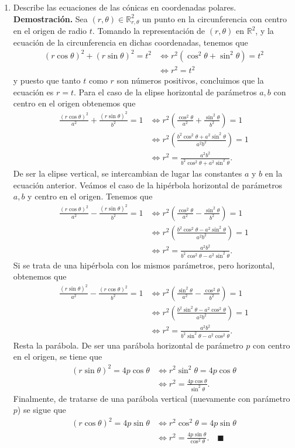 \documentclass[12pt]{article}
\newcommand{\R}{\mathbb R}
\begin{document}
\begin{enumerate}
\newpage
\item Describe las ecuaciones de las c\'onicas en coordenadas polares. \\
\textbf{Demostración.} Sea $(r,\theta)\in \R^2_{r,\theta}$ un punto en la circunferencia con centro en el origen de radio $t$. Tomando la representación de $(r,\theta)$ en
$\R^2$, y la ecuación de la circunferencia en dichas coordenadas, tenemos que
\begin{align*}
    (r\cos\theta)^2+(r\sin\theta)^2=t^2 &\iff r^2(\cos^2\theta+\sin^2\theta)=t^2 \\
    &\iff r^2=t^2
\end{align*}
y puesto que tanto $t$ como $r$ son números positivos, concluimos que la ecuación es $r=t$. Para el caso de la elipse horizontal de parámetros $a,b$ con centro en el origen obtenemos que
\begin{align*}
    \frac{(r\cos\theta)^2}{a^2}+\frac{(r\sin\theta)^2}{b^2}=1 &\iff r^2\left(\frac{\cos^2\theta}{a^2}+\frac{\sin^2\theta}{b^2}\right)=1\\
    &\iff r^2\left(\frac{b^2\cos^2\theta+a^2\sin^2\theta}{a^2b^2}\right)=1 \\
    &\iff r^2=\frac{a^2b^2}{b^2\cos^2\theta+a^2\sin^2\theta}.
\end{align*}
De ser la elipse vertical, se intercambian de lugar las constantes $a$ y $b$ en la ecuación anterior. Veámos el caso de la hipérbola horizontal de parámetros $a,b$ y centro en el origen. Tenemos que
\begin{align*}
    \frac{(r\cos\theta)^2}{a^2}-\frac{(r\sin\theta)^2}{b^2}=1 &\iff r^2\left(\frac{\cos^2\theta}{a^2}-\frac{\sin^2\theta}{b^2}\right)=1\\
    &\iff r^2\left(\frac{b^2\cos^2\theta-a^2\sin^2\theta}{a^2b^2}\right)=1 \\
    &\iff r^2=\frac{a^2b^2}{b^2\cos^2\theta-a^2\sin^2\theta}.
\end{align*}
Si se trata de una hipérbola con los mismos parámetros, pero horizontal, obtenemos que
\begin{align*}
    \frac{(r\sin\theta)^2}{a^2}-\frac{(r\cos\theta)^2}{b^2}=1 &\iff r^2\left(\frac{\sin^2\theta}{a^2}-\frac{\cos^2\theta}{b^2}\right)=1\\
    &\iff r^2\left(\frac{b^2\sin^2\theta-a^2\cos^2\theta}{a^2b^2}\right)=1 \\
    &\iff r^2=\frac{a^2b^2}{b^2\sin^2\theta-a^2\cos^2\theta}.
\end{align*}
Resta la parábola. De ser una parábola horizontal de parámetro $p$ con centro en el origen, se tiene que
\begin{align*}
    (r\sin\theta)^2=4p\cos\theta &\iff r^2\sin^2\theta = 4p\cos\theta \\
    &\iff r^2 = \frac{4p\cos\theta}{\sin^2\theta}.
\end{align*}
Finalmente, de tratarse de una parábola vertical (nuevamente con parámetro $p$) se sigue que
\begin{align*}
    (r\cos\theta)^2=4p\sin\theta &\iff r^2\cos^2\theta = 4p\sin\theta \\
    &\iff r^2 = \frac{4p\sin\theta}{\cos^2\theta}.    \quad \blacksquare
\end{align*}
\end{enumerate}
\end{document}

